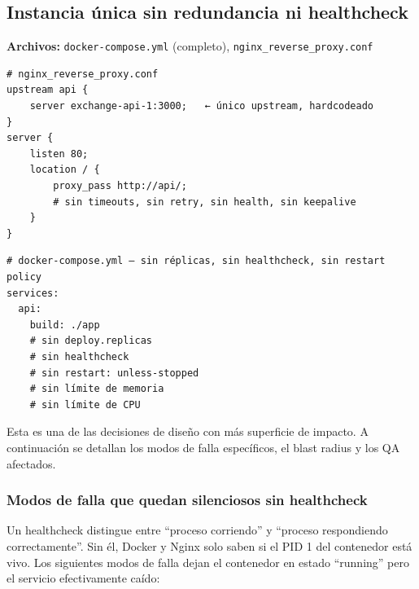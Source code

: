\subsection{Instancia única sin redundancia ni healthcheck}

\textbf{Archivos:} \texttt{docker-compose.yml} (completo), \texttt{nginx\_reverse\_proxy.conf}

\begin{verbatim}
# nginx_reverse_proxy.conf
upstream api {
    server exchange-api-1:3000;   ← único upstream, hardcodeado
}
server {
    listen 80;
    location / {
        proxy_pass http://api/;
        # sin timeouts, sin retry, sin health, sin keepalive
    }
}
\end{verbatim}

\begin{verbatim}
# docker-compose.yml — sin réplicas, sin healthcheck, sin restart policy
services:
  api:
    build: ./app
    # sin deploy.replicas
    # sin healthcheck
    # sin restart: unless-stopped
    # sin límite de memoria
    # sin límite de CPU
\end{verbatim}

Esta es una de las decisiones de diseño con más superficie de impacto. A continuación se detallan los modos de falla específicos, el blast radius y los QA afectados.

\subsubsection{Modos de falla que quedan silenciosos sin healthcheck}

Un healthcheck distingue entre ``proceso corriendo'' y ``proceso respondiendo correctamente''. Sin él, Docker y Nginx solo saben si el PID 1 del contenedor está vivo. Los siguientes modos de falla dejan el contenedor en estado ``running'' pero el servicio efectivamente caído:

